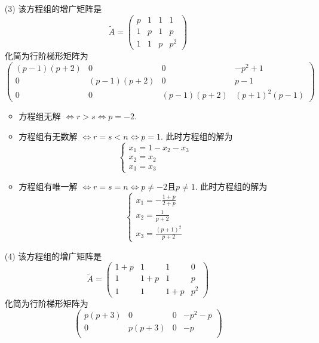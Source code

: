 \documentclass{article}
\begin{document}
\begin{itemize}
    \item[(3)]
    该方程组的增广矩阵是
    $$
    \tilde{A} = \begin{pmatrix}
        p & 1 & 1 & 1 \\
        1 & p & 1 & p \\
        1 & 1 & p & p^2
    \end{pmatrix}
    $$
    化简为行阶梯形矩阵为
    $$
    \begin{pmatrix}
        (p - 1)(p + 2) & 0 & 0 & -p^2 + 1 \\
        0 & (p - 1)(p + 2) & 0 & p - 1 \\
        0 & 0 & (p - 1)(p + 2) & (p + 1)^2(p - 1)
    \end{pmatrix}
    $$
    \begin{itemize}
        \item 方程组无解 $\Leftrightarrow r > s \Leftrightarrow p = -2$.
        \item 方程组有无数解 $\Leftrightarrow r = s < n \Leftrightarrow p = 1$.
            此时方程组的解为
            $$\begin{cases}
                x_1 = 1 - x_2 - x_3\\
                x_2 = x_2 \\
                x_3 = x_3
            \end{cases}
            $$
        \item 方程组有唯一解 $\Leftrightarrow r = s = n \Leftrightarrow p \neq -2 \text{且} p \neq 1 $.
            此时方程组的解为
            $$
            \begin{cases}
                x_1 = -\frac{1 + p}{2 + p} \\
                x_2 = \frac{1}{p + 2} \\
                x_3 = \frac{(p + 1)^2}{p + 2}
            \end{cases}
            $$
    \end{itemize}
    \item[(4)]
    该方程组的增广矩阵是
    $$
    \tilde{A} = \begin{pmatrix}
        1 + p & 1 & 1 & 0 \\
        1 & 1 + p & 1 & p \\
        1 & 1 & 1 + p & p^2
    \end{pmatrix}    
    $$
    化简为行阶梯形矩阵为
    $$
    \begin{pmatrix}
        p(p + 3) & 0 & 0 & -p^2 - p \\
        0 & p(p + 3) & 0 & -p \\

\end{pmatrix}$$
\end{itemize}
\end{document}
